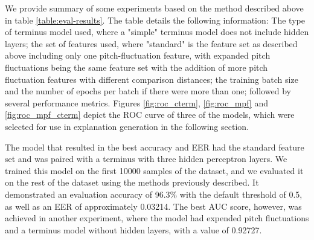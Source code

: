 \documentclass{article}
\begin{document}
		\sloppy
		We provide summary of some experiments based on the method described above in table
		\ref{table:eval-results}. The table details the following information: The type of
		terminus model used, where a "simple" terminus model does not include hidden layers; the
		set of features used, where "standard" is the feature set as described above including
		only one pitch-fluctuation feature, with expanded pitch fluctuations being the same
		feature set with the addition of more pitch fluctuation features with different comparison
		distances; the training batch size and the number of epochs per batch if there were more
		than one; followed by several performance metrics. Figures \ref{fig:roc_cterm},
		\ref{fig:roc_mpf} and \ref{fig:roc_mpf_cterm} depict the ROC curve of three of the models,
		which were selected for use in explanation generation in the following section.
		\par
		The model that resulted in the best accuracy and EER had the standard feature set and was
		paired with a terminus with three hidden perceptron layers. We trained this model on the
		first 10000 samples of the dataset, and we evaluated it on the rest of the dataset using
		the methods previously described. It demonstrated an evaluation accuracy of 96.3\% with
		the default threshold of 0.5, as well as an EER of approximately 0.03214. The best AUC
		score, however, was achieved in another experiment, where the model had expended pitch
		fluctuations and a terminus model without hidden layers, with a value of 0.92727.
\end{document}

